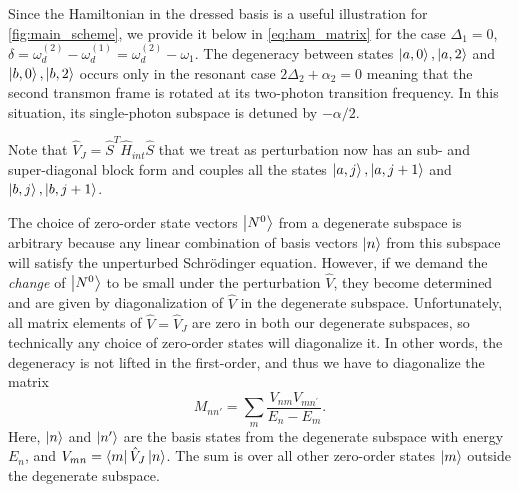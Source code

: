 \documentclass[%
 aps, prx,
 amsmath,amssymb,
 reprint,%
superscriptaddress
]{revtex4-2}
\begin{document}
Since the Hamiltonian in the dressed basis is a 
useful illustration for 
\autoref{fig:main_scheme}, we provide it below in 
\autoref{eq:ham_matrix} for the case $\Delta_1 = 
0$, $\delta = \omega_d^{(2)} - 	\omega_d^{(1)} = 
\omega_d^{(2)} - \omega_1$. The degeneracy between 
states $\ket{a, 0}, \ket{a,2}$ and $\ket{b, 0}, 
\ket{b,2}$ occurs only in the resonant case 
$2\Delta_2   + \alpha_2 = 0$ meaning that the 
second transmon frame is rotated at its 
two-photon transition frequency. In this 
situation, its single-photon subspace is detuned 
by $-\alpha/2$.




Note that $\hat V_J = \hat S^T \hat H_{int} \hat 
S$ that we treat as perturbation now has an sub- 
and super-diagonal block form and couples all the 
states $\ket{a, j}, \ket{a,j+1}$ and $\ket{b, j}, 
\ket{b,j+1}$.



The choice of zero-order state vectors $\ket{N^0}$ from a degenerate subspace is arbitrary because any linear combination of basis vectors $\ket{n}$ from this subspace will satisfy the unperturbed Schrödinger equation. However, if we demand the \textit{change} of $\ket{N^0}$ to be small under the perturbation $\hat V$, they become determined and are given by diagonalization of $\hat V$ in the degenerate subspace. Unfortunately, all matrix elements of $\hat V = \hat V_J$ are zero in both our degenerate subspaces, so technically any choice of zero-order states will diagonalize it. In other words, the degeneracy is not lifted in the first-order, and thus we have to diagonalize the matrix \cite{landau2013quantum}
\begin{equation}
	M_{nn'} = \sum\limits_{m}\frac{V_{ nm}V_{mn^\prime}}{E_n-E_m}.
\end{equation}
Here, $\ket{n}$ and $\ket{n'}$ are the basis 
states from the degenerate subspace with energy 
$E_n$, and $V_{mn} = \bra{m} \hat  V_J \ket{n}$. 
The sum is over all other zero-order states 
$\ket{m}$ outside the degenerate subspace.
\end{document}
